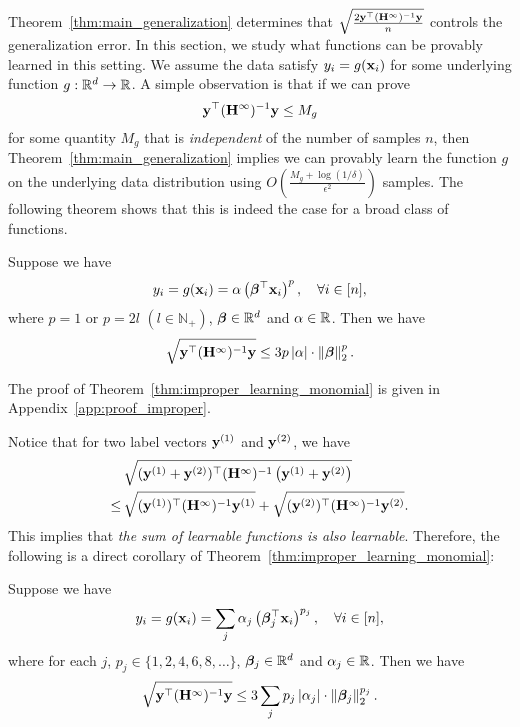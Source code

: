 




Theorem~\ref{thm:main_generalization} determines that $\sqrt{\frac{2 \mathbf{y}^\top (\mathbf{H}^\infty)^{-1}\mathbf{y} }{n}}$ controls the generalization error.
In this section, we study what functions can be provably learned in this setting.
We assume the data satisfy $y_i = g(\mathbf{x}_i)$ for some underlying function $g:\mathbb{R}^d\to\mathbb{R}$.
A simple observation is that if we can prove $$\mathbf{y}^\top (\mathbf{H}^\infty)^{-1}\mathbf{y} \le M_g$$ for some quantity $M_g$ that is \emph{independent} of the number of samples $n$, then Theorem~\ref{thm:main_generalization} implies we can provably learn the function $g$ on the underlying data distribution using $ O\left( \frac{M_g+\log(1/\delta)}{\epsilon^2} \right) $ samples.
The following theorem shows that this is indeed the case for a broad class of functions.

\begin{thm}\label{thm:improper_learning_monomial}
	Suppose we have
	\begin{align*}
	y_i = g(\mathbf{x}_i) = \alpha \left( \bm{\beta}^\top \mathbf{x}_i \right)^p, \quad \forall i\in[n],
	\end{align*}
	where $p=1$ or $p=2l$ $(l\in\mathbb N_+)$,	$\bm{\beta} \in \mathbb{R}^d$ and $\alpha\in \mathbb{R}$.
	Then we have
\vspace{-0.3cm}
	\begin{align*}
	\sqrt{\mathbf{y}^\top (\mathbf{H}^\infty)^{-1}\mathbf{y} } \le  3 p \left|\alpha\right| \cdot \left\|\bm{\beta}\right\|_2^{p}.
	\end{align*}
\vspace{-0.7cm}
\end{thm}

The proof of Theorem~\ref{thm:improper_learning_monomial} is given in Appendix~\ref{app:proof_improper}.


Notice that for two label vectors $\mathbf{y}^{(1)}$ and $\mathbf{y}^{(2)}$, we have
\begin{align*}
&\sqrt{(\mathbf{y}^{(1)}+\mathbf{y}^{(2)})^\top (\mathbf{H}^{\infty})^{-1}  \left(\mathbf{y}^{(1)}+\mathbf{y}^{(2)}\right)} \\
\le\,&
\sqrt{(\mathbf{y}^{(1)})^\top (\mathbf{H}^{\infty})^{-1}  \mathbf{y}^{(1)}} + \sqrt{(\mathbf{y}^{(2)})^\top (\mathbf{H}^{\infty})^{-1}  \mathbf{y}^{(2)}}.
\end{align*}
This implies that \emph{the sum of learnable functions is also learnable}. Therefore, the following is a direct corollary of Theorem~\ref{thm:improper_learning_monomial}:
\begin{cor}\label{cor:improper_learning_polynomial}
	Suppose we have 
	\begin{align}
	y_i = g(\mathbf{x}_i) = \sum_{j} \alpha_j \left( \bm{\beta}_j^\top \mathbf{x}_i \right)^{p_j} , \quad \forall i\in[n],
	\label{eqn:g_decomp}
	\end{align}
	where for each $j$, $p_j \in \{1, 2, 4, 6, 8, \ldots\}$, $\bm{\beta}_j \in \mathbb{R}^d$ and $\alpha_j \in \mathbb{R}$.
	Then we have
	\begin{align} \label{eqn:g_complexity}
	\sqrt{\mathbf{y}^\top (\mathbf{H}^\infty)^{-1}\mathbf{y} } \le 3 \sum_{j} p_j \left|\alpha_j\right| \cdot \left\|\bm{\beta}_j\right\|_2^{p_j}.
	\end{align}
\end{cor}



